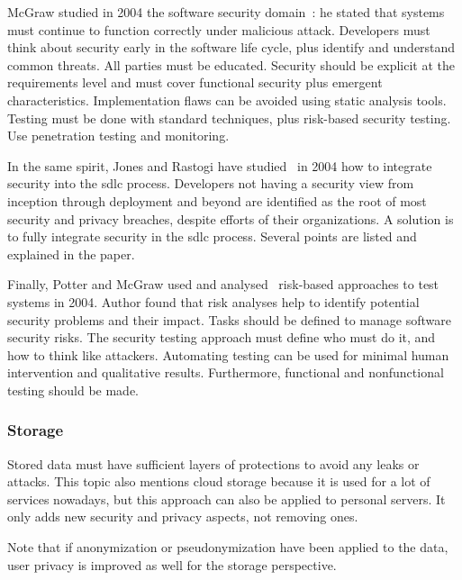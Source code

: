 McGraw studied in 2004 the software security domain~\cite{mcgraw_software_2004}: he stated that systems must continue to function correctly under malicious attack. Developers must think about security early in the software life cycle, plus identify and understand common threats. All parties must be educated. Security should be explicit at the requirements level and must cover functional security plus emergent characteristics. Implementation flaws can be avoided using static analysis tools. Testing must be done with standard techniques, plus risk-based security testing. Use penetration testing and monitoring. %

In the same spirit, Jones and Rastogi have studied~\cite{jones_secure_2004} in 2004 how to integrate security into the \gls{sdlc} process. Developers not having a security view from inception through deployment and beyond are identified as the root of most security and privacy breaches, despite efforts of their organizations. A solution is to fully integrate security in the \gls{sdlc} process. Several points are listed and explained in the paper. %

Finally, Potter and McGraw used and analysed~\cite{potter_software_2004} risk-based approaches to test systems in 2004. Author found that risk analyses help to identify potential security problems and their impact. Tasks should be defined to manage software security risks. The security testing approach must define who must do it, and how to think like attackers. Automating testing can be used for minimal human intervention and qualitative results. Furthermore, functional and nonfunctional testing should be made. %

\subsubsection{Storage}
\label{subsubsec:state_review_results_storage}

Stored data must have sufficient layers of protections to avoid any leaks or attacks. This topic also mentions \gls{cloud} storage because it is used for a lot of services nowadays, but this approach can also be applied to personal servers. It only adds new security and privacy aspects, not removing ones.

Note that if anonymization or pseudonymization have been applied to the data, user privacy is improved as well for the storage perspective. 

